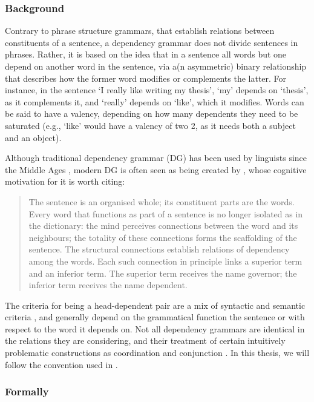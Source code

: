 \documentclass{report}
\theoremstyle{break}
\begin{document}
\subsubsection{Background}

Contrary to phrase structure grammars, that establish relations between constituents of a sentence, a dependency grammar does not divide sentences in phrases. Rather, it is based on the idea that in a sentence all words but one depend on another word in the sentence, via a(n asymmetric) binary relationship that describes how the former word modifies or complements the latter. For instance, in the sentence `I really like writing my thesis', `my' depends on `thesis', as it complements it, and `really' depends on `like', which it modifies. Words can be said to have a valency, depending on how many dependents they need to be saturated (e.g., `like' would have a valency of two 2, as it needs both a subject and an object).

Although traditional dependency grammar (DG) has been used by linguists since the Middle Ages \citep{covington1990dependency}, modern DG is often seen as being created by \cite{tesniere1959elements}, whose cognitive motivation for it is worth citing:

\begin{quote}
The sentence is an organised whole; its constituent parts are the words. Every word that functions as part of a sentence is no longer isolated as in the dictionary: the mind perceives connections between the word and its neighbours; the totality of these connections forms the scaffolding of the sentence. The structural connections establish relations of dependency among the words. Each such connection in principle links a superior term and an inferior term. The superior term receives the name governor; the inferior term receives the name dependent. \citep[Translation:][]{ryan2013}
\end{quote}

The criteria for being a head-dependent pair are a mix of syntactic and semantic criteria \citep{nivre2005dependency}, and generally depend on the grammatical function the sentence or with respect to the word it depends on. Not all dependency grammars are identical in the relations they are considering, and their treatment of certain intuitively problematic constructions as coordination and conjunction \citep{nivre2005dependency}. In this thesis, we will follow the convention used in \cite{de2006generating}.

\subsubsection{Formally}
\end{document}
